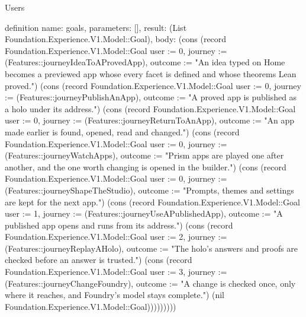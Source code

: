 \begin{lexlean}{Users}
\begin{semanticmodule}
definition{
  name: goals,
  parameters: [],
  result: (List Foundation.Experience.V1.Model::Goal),
  body: (cons (record Foundation.Experience.V1.Model::Goal {user := 0, journey := (Features::journeyIdeaToAProvedApp), outcome := "An idea typed on Home becomes a previewed app whose every facet is defined and whose theorems Lean proved."}) (cons (record Foundation.Experience.V1.Model::Goal {user := 0, journey := (Features::journeyPublishAnApp), outcome := "A proved app is published as a holo under its address."}) (cons (record Foundation.Experience.V1.Model::Goal {user := 0, journey := (Features::journeyReturnToAnApp), outcome := "An app made earlier is found, opened, read and changed."}) (cons (record Foundation.Experience.V1.Model::Goal {user := 0, journey := (Features::journeyWatchApps), outcome := "Prism apps are played one after another, and the one worth changing is opened in the builder."}) (cons (record Foundation.Experience.V1.Model::Goal {user := 0, journey := (Features::journeyShapeTheStudio), outcome := "Prompts, themes and settings are kept for the next app."}) (cons (record Foundation.Experience.V1.Model::Goal {user := 1, journey := (Features::journeyUseAPublishedApp), outcome := "A published app opens and runs from its address."}) (cons (record Foundation.Experience.V1.Model::Goal {user := 2, journey := (Features::journeyReplayAHolo), outcome := "The holo's answers and proofs are checked before an answer is trusted."}) (cons (record Foundation.Experience.V1.Model::Goal {user := 3, journey := (Features::journeyChangeFoundry), outcome := "A change is checked once, only where it reaches, and Foundry's model stays complete."}) (nil Foundation.Experience.V1.Model::Goal)))))))))
}


\end{semanticmodule}
\end{lexlean}
